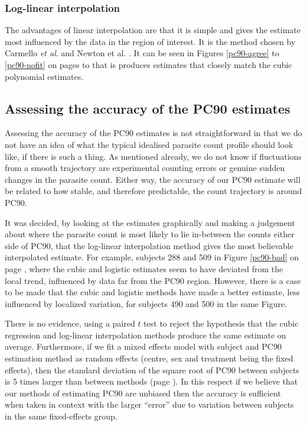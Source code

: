 \subsubsection*{Log-linear interpolation}
The advantages of linear interpolation are that it is simple and gives the estimate most influenced by the data in the region of interest. It is the method chosen by Carmello {\it et al}. \cite{carmello} and Newton {et al}. \cite{newton}. It can be seen in Figures \ref{pc90-agree} to \ref{pc90-nofit} on pages \pageref{pc90-agree} to \pageref{pc90-nofit} that is produces estimates that closely match the cubic polynomial estimates.

\subsection{Assessing the accuracy of the PC90 estimates}
Assessing the accuracy of the PC90 estimates is not straightforward in that we do not have an idea of what the typical idealised parasite count profile should look like, if there is such a thing. As mentioned already, we do not know if fluctuations from a smooth trajectory are experimental counting errors or genuine sudden changes in the parasite count. Either way, the accuracy of our PC90 estimate will be related to how stable, and therefore predictable, the count trajectory is around PC90.

It was decided, by looking at the estimates graphically and making a judgement about where the parasite count is most likely to lie in-between the counts either side of PC90, that the log-linear interpolation method gives the most believable interpolated estimate. For example, subjects 288 and 509 in Figure \ref{pc90-bad} on page \pageref{pc90-bad}, where the cubic and logistic estimates seem to have deviated from the local trend, influenced by data far from the PC90 region. However, there is a case to be made that the cubic and logistic methods have made a better estimate, less influenced by localized variation, for subjects 490 and 500 in the same Figure.

There is no evidence, using a paired $t$ test to reject the hypothesis that the cubic regression and log-linear interpolation methods produce the same estimate on average. Furthermore, if we fit a mixed effects model with subject and PC90 estimation method as random effects (centre, sex and treatment being the fixed effects), then the standard deviation of the square root of PC90 between subjects is 5 times larger than between methods (page \pageref{methods.lme}). In this respect if we believe that our methods of estimating PC90 are unbiased then the accuracy is sufficient when taken in context with the larger ``error'' due to variation between subjects in the same fixed-effects group.

